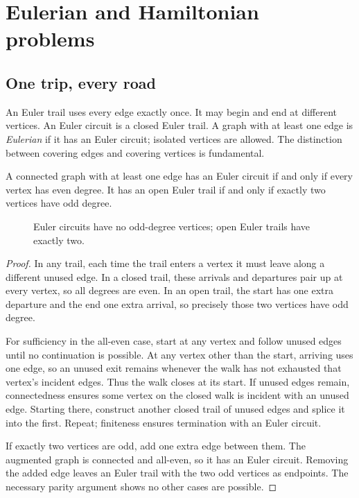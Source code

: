 \chapter{Eulerian and Hamiltonian problems}
\section*{One trip, every road}
An Euler trail uses every edge exactly once. It may begin and end at different vertices. An Euler circuit is a closed Euler trail. A graph with at least one edge is \emph{Eulerian} if it has an Euler circuit; isolated vertices are allowed. The distinction between covering edges and covering vertices is fundamental.

\begin{theorem}
A connected graph with at least one edge has an Euler circuit if and only if every vertex has even degree. It has an open Euler trail if and only if exactly two vertices have odd degree.
\end{theorem}
\begin{figure}[htbp]
\centering
{}
\caption{Euler circuits have no odd-degree vertices; open Euler trails have exactly two.}
\end{figure}
\begin{proof}
In any trail, each time the trail enters a vertex it must leave along a different unused edge. In a closed trail, these arrivals and departures pair up at every vertex, so all degrees are even. In an open trail, the start has one extra departure and the end one extra arrival, so precisely those two vertices have odd degree.

For sufficiency in the all-even case, start at any vertex and follow unused edges until no continuation is possible. At any vertex other than the start, arriving uses one edge, so an unused exit remains whenever the walk has not exhausted that vertex's incident edges. Thus the walk closes at its start. If unused edges remain, connectedness ensures some vertex on the closed walk is incident with an unused edge. Starting there, construct another closed trail of unused edges and splice it into the first. Repeat; finiteness ensures termination with an Euler circuit.

If exactly two vertices are odd, add one extra edge between them. The augmented graph is connected and all-even, so it has an Euler circuit. Removing the added edge leaves an Euler trail with the two odd vertices as endpoints. The necessary parity argument shows no other cases are possible.
\end{proof}


